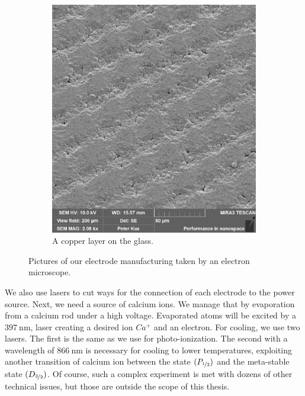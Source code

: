\begin{figure}[H]
\begin{subfigure}{.465\textwidth}
	\includegraphics[width=\linewidth]{img/200um_copper.pdf}
	\caption{A copper layer on the glass.\\}
	\label{fig:quadrupole picture}
\end{subfigure}
\caption{Pictures of our electrode manufacturing taken by an electron microscope.}
\label{fig:trap manufacturing}
\end{figure}
We also use lasers to cut ways for the connection of each electrode to the power source. Next, we need a source of calcium ions. We manage that by evaporation from a calcium rod under a high voltage. Evaporated atoms will be excited by a $\SI{397}{\nano\meter}$, laser creating a desired ion $Ca^+$ and an electron. For cooling, we use two lasers. The first is the same as we use for photo-ionization. The second with a wavelength of $\SI{866}{\nano\meter}$ is necessary for cooling to lower temperatures, exploiting another transition of calcium ion between the state $(P_{\nicefrac{1}{2}})$ and the meta-stable state $(D_{\nicefrac{3}{2}})$. Of course, such a complex experiment is met with dozens of other technical issues, but those are outside the scope of this thesis.